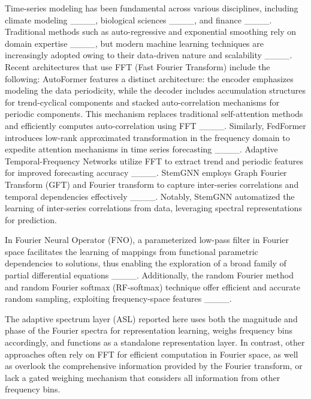 Time-series modeling has been fundamental across various disciplines, including climate modeling ____, biological sciences ____, and finance ____. Traditional methods such as auto-regressive and exponential smoothing rely on domain expertise ____, but modern machine learning techniques are increasingly adopted owing to their data-driven nature and scalability ____.
Recent architectures that use FFT (Fast Fourier Transform) include the following: 
AutoFormer features a distinct architecture: the encoder emphasizes modeling the data periodicity, while the decoder includes accumulation structures for trend-cyclical components and stacked auto-correlation mechanisms for periodic components. This mechanism replaces traditional self-attention methods and efficiently computes auto-correlation using FFT ____. Similarly, FedFormer introduces low-rank approximated transformation in the frequency domain to expedite attention mechanisms in time series forecasting ____. Adaptive Temporal-Frequency Networks utilize FFT to extract trend and periodic features for improved forecasting accuracy ____. StemGNN employs Graph Fourier Transform (GFT) and Fourier transform to capture inter-series correlations and temporal dependencies effectively ____. Notably, StemGNN automatized the learning of inter-series correlations from data, leveraging spectral representations for prediction.

In Fourier Neural Operator (FNO), a parameterized low-pass filter in Fourier space facilitates the learning of mappings from functional parametric dependencies to solutions, thus enabling the exploration of a broad family of partial differential equations ____. Additionally, the random Fourier method and random Fourier softmax (RF-softmax) technique offer efficient and accurate random sampling, exploiting frequency-space features ____.

The adaptive spectrum layer (ASL) reported here uses both the magnitude and phase of the Fourier spectra for representation learning, weighs frequency bins accordingly, and functions as a standalone representation layer. In contrast, other approaches often rely on FFT for efficient computation in Fourier space, as well as overlook the comprehensive information provided by the Fourier transform, or lack a gated weighing mechanism that considers all information from other frequency bins.